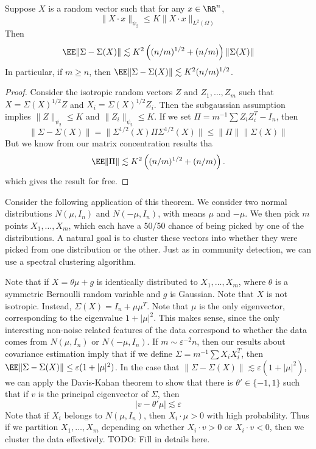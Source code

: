 \begin{theorem}
	Suppose $X$ is a random vector such that for any $x \in \RR^n$,
	\[ \| X \cdot x \|_{\psi_2} \leq K \| X \cdot x \|_{L^2(\Omega)} \]
	Then
	\[ \EE \| \Sigma - \Sigma(X) \| \lesssim K^2 \left( (n/m)^{1/2} + (n/m) \right) \| \Sigma(X) \| \]
	In particular, if $m \geq n$, then $\EE \| \Sigma - \Sigma(X) \| \lesssim K^2 (n/m)^{1/2}$.
\end{theorem}
\begin{proof}
	Consider the isotropic random vectors $Z$ and $Z_1, \dots, Z_m$ such that $X = \Sigma(X)^{1/2} Z$ and $X_i = \Sigma(X)^{1/2} Z_i$. Then the subgaussian assumption implies $\| Z \|_{\psi_2} \leq K$ and $\| Z_i \|_{\psi_2} \leq K$. If we set $\Pi = m^{-1} \sum Z_i Z_i^T - I_n$, then
	\[ \| \Sigma - \Sigma(X) \| = \| \Sigma^{1/2}(X) \Pi \Sigma^{1/2}(X) \| \leq \| \Pi \| \| \Sigma(X) \| \]
	But we know from our matrix concentration results tha
	\[ \EE \| \Pi \| \lesssim K^2 \left( (n/m)^{1/2} + (n/m) \right). \]
	which gives the result for free.
\end{proof}

Consider the following application of this theorem. We consider two normal distributions $N(\mu,I_n)$ and $N(-\mu,I_n)$, with means $\mu$ and $-\mu$. We then pick $m$ points $X_1, \dots, X_m$, which each have a 50/50 chance of being picked by one of the distributions. A natural goal is to cluster these vectors into whether they were picked from one distribution or the other. Just as in community detection, we can use a spectral clustering algorithm.

Note that if $X = \theta \mu + g$ is identically distributed to $X_1, \dots, X_m$, where $\theta$ is a symmetric Bernoulli random variable and $g$ is Gaussian. Note that $X$ is not isotropic. Instead, $\Sigma(X) = I_n + \mu \mu^T$. Note that $\mu$ is the only eigenvector, corresponding to the eigenvalue $1 + |\mu|^2$. This makes sense, since the only interesting non-noise related features of the data correspond to whether the data comes from $N(\mu,I_n)$ or $N(-\mu,I_n)$. If $m \sim \varepsilon^{-2} n$, then our results about covariance estimation imply that if we define $\Sigma = m^{-1} \sum X_i X_i^T$, then $\EE \| \Sigma - \Sigma(X) \| \leq \varepsilon (1 + |\mu|^2)$. In the case that $\| \Sigma - \Sigma(X) \| \lesssim \varepsilon (1 + |\mu|^2)$, we can apply the Davis-Kahan theorem to show that there is $\theta' \in \{ -1 , 1 \}$ such that if $v$ is the principal eigenvector of $\Sigma$, then
%
\[ |v - \theta' \mu| \lesssim \varepsilon \]
%
Note that if $X_i$ belongs to $N(\mu,I_n)$, then $X_i \cdot \mu > 0$ with high probability. Thus if we partition $X_1, \dots, X_m$ depending on whether $X_i \cdot v > 0$ or $X_i \cdot v < 0$, then we cluster the data effectively. TODO: Fill in details here.






